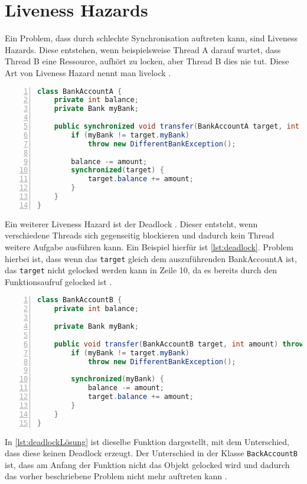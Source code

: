 \section{Liveness Hazards}

Ein Problem, dass durch schlechte Synchronisation auftreten kann, sind Liveness Hazards. Diese entstehen, wenn beispielsweise Thread A darauf wartet, dass Thread B eine Ressource, aufhört zu locken, aber Thread B dies nie tut. Diese Art von Liveness Hazard nennt man livelock \cite[vgl.][5-6]{brian}.

\begin{lstlisting}[language=Java,frame=tb,caption={Deadlock \cite{fekete_teaching_nodate}}, label={lst:deadlock}, numbers=left, stepnumber=1, captionpos=b, tabsize=4]
class BankAccountA {
    private int balance; 
    private Bank myBank; 

    public synchronized void transfer(BankAccountA target, int amount) throws DifferentBankException {
        if (myBank != target.myBank) 
            throw new DifferentBankException(); 
        
        balance -= amount; 
        synchronized(target) { 
            target.balance += amount; 
        } 
    }
}
\end{lstlisting}

Ein weiterer Liveness Hazard ist der Deadlock \cite[vgl.][6]{brian}. Dieser entsteht, wenn verschiedene Threads sich gegenseitig blockieren und dadurch kein Thread weitere Aufgabe ausführen kann. Ein Beispiel hierfür ist \ref{lst:deadlock}. Problem hierbei ist, dass wenn das \texttt{target} gleich dem auszuführenden BankAccountA ist, das \texttt{target} nicht gelocked werden kann in Zeile 10, da es bereits durch den Funktionsaufruf gelocked ist \cite[vgl.][122]{fekete_teaching_nodate}. 
\\
\begin{lstlisting}[language=Java,frame=tb,caption={Deadlock Lösung \cite{fekete_teaching_nodate}}, label={lst:deadlockLösung}, numbers=left, stepnumber=1, captionpos=b, tabsize=4]
class BankAccountB { 
    private int balance; 
    
    private Bank myBank; 

    public void transfer(BankAccountB target, int amount) throws DifferentBankException { 
        if (myBank != target.myBank)
            throw new DifferentBankException(); 
        
        synchronized(myBank) { 
            balance -= amount; 
            target.balance += amount; 
        } 
    }
}
\end{lstlisting}

In \ref{lst:deadlockLösung} ist dieselbe Funktion dargestellt, mit dem Unterschied, dass diese keinen Deadlock erzeugt. Der Unterschied in der Klasse \texttt{BackAccountB} ist, dass am Anfang der Funktion nicht das Objekt gelocked wird und dadurch das vorher beschriebene Problem nicht mehr auftreten kann \cite[vgl.][122]{fekete_teaching_nodate}.